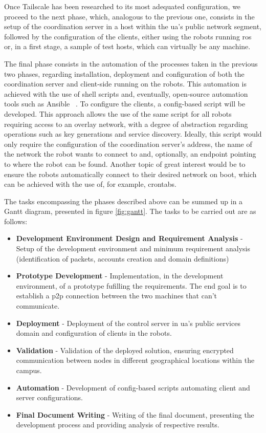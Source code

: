 \documentclass[11pt,twoside,a4paper]{report}
\begin{document}
Once Tailscale has been researched to its most adequated configuration, we proceed to the next phase, which, analogous to the previous one, consists in the setup of the coordination server in a host within the \ac{ua}'s public network segment, followed by the configuration of the clients, either using the robots running \ac{ros} or, in a first stage, a sample of test hosts, which can virtually be any machine.

The final phase consists in the automation of the processes taken in the previous two phases, regarding installation, deployment and configuration of both the coordination server and client-side running on the robots. This automation is achieved with the use of shell scripts and, eventually, open-source automation tools such as Ansible ~\cite{ansiblews}. To configure the clients, a config-based script will be developed. This approach allows the use of the same script for all robots requiring access to an overlay network, with a degree of abstraction regarding operations such as key generations and service discovery. Ideally, this script would only require the configuration of the coordination server's address, the name of the network the robot wants to connect to and, optionally, an endpoint pointing to where the robot can be found. Another topic of great interest would be to ensure the robots automatically connect to their desired network on boot, which can be achieved with the use of, for example, crontabs.

The tasks encompassing the phases described above can be summed up in a Gantt diagram, presented in figure \ref{fig:gantt}. The tasks to be carried out are as follows:

\begin{itemize}
  \item \textbf{Development Environment Design and Requirement Analysis} - Setup of the development environment and minimum requirement analysis (identification of packets, accounts creation and domain definitions)
  \item \textbf{Prototype Development} - Implementation, in the development environment, of a prototype fufilling the requirements. The end goal is to establish a \ac{p2p} connection between the two machines that can't communicate.
  \item \textbf{Deployment} - Deployment of the control server in \ac{ua}'s public services domain and configuration of clients in the robots.
  \item \textbf{Validation} - Validation of the deployed solution, ensuring encrypted communication between nodes in different geographical locations within the campus.
  \item \textbf{Automation} - Development of config-based scripts automating client and server configurations.
  \item \textbf{Final Document Writing} - Writing of the final document, presenting the development process and providing analysis of respective results.
\end{itemize}
\end{document}
